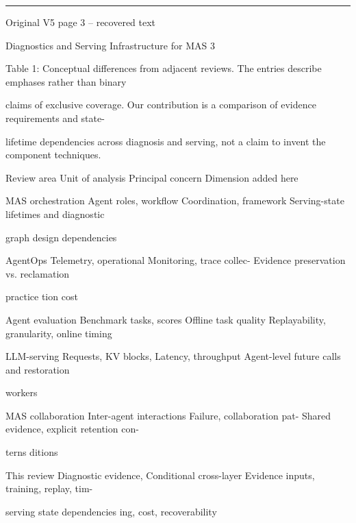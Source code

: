 \par\smallskip\noindent\rule{\textwidth}{0.4pt}\par{\sffamily\footnotesize Original V5 page 3 -- recovered text}\par\begin{flushleft}\footnotesize\ttfamily
\par\smallskip
\par\smallskip
\noindent Diagnostics and Serving Infrastructure for MAS 3\par
\par\smallskip
\par\smallskip
\noindent Table 1: Conceptual differences from adjacent reviews. The entries describe emphases rather than binary\par
\noindent claims of exclusive coverage. Our contribution is a comparison of evidence requirements and state-\par
\noindent lifetime dependencies across diagnosis and serving, not a claim to invent the component techniques.\par
\par\smallskip
\noindent  Review area Unit of analysis Principal concern Dimension added here\par
\noindent  MAS orchestration Agent roles, workflow Coordination, framework Serving-state lifetimes and diagnostic\par
\noindent  graph design dependencies\par
\noindent  AgentOps Telemetry, operational Monitoring, trace collec- Evidence preservation vs. reclamation\par
\noindent  practice tion cost\par
\noindent  Agent evaluation Benchmark tasks, scores Offline task quality Replayability, granularity, online timing\par
\noindent  LLM-serving Requests, KV blocks, Latency, throughput Agent-level future calls and restoration\par
\noindent  workers\par
\noindent  MAS collaboration Inter-agent interactions Failure, collaboration pat- Shared evidence, explicit retention con-\par
\noindent  terns ditions\par
\noindent  This review Diagnostic evidence, Conditional cross-layer Evidence inputs, training, replay, tim-\par
\noindent  serving state dependencies ing, cost, recoverability\par

\end{flushleft}
